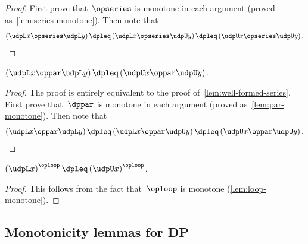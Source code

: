 \begin{proof}
First prove that~$\opseries$ is monotone in each argument (proved
as~\cref{lem:series-monotone}). Then note that
\[
\left(\udpL x\opseries\udpL y\right)\dpleq\left(\udpL x\opseries\udpU y\right)\dpleq\left(\udpU x\opseries\udpU y\right).
\]
\end{proof}
\begin{lemma}
\label{lem:well-formed-par}$\left(\udpL x\oppar\udpL y\right)\dpleq\left(\udpU x\oppar\udpU y\right)$.
\end{lemma}
\begin{proof}
The proof is entirely equivalent to the proof of~\cref{lem:well-formed-series}.
First prove that~$\dppar$ is monotone in each argument (proved as~\cref{lem:par-monotone}).
Then note that~
\[
\left(\udpL x\oppar\udpL y\right)\dpleq\left(\udpL x\oppar\udpU y\right)\dpleq\left(\udpU x\oppar\udpU y\right).
\]
\end{proof}

\begin{lemma}
\label{lem:well-formed-loop}$\left(\udpL x\right)^{\oploop}\dpleq\left(\udpU x\right)^{\oploop}$.
\end{lemma}
\begin{proof}
This follows from the fact that~$\oploop$ is monotone (\cref{lem:loop-monotone}).
\end{proof}


\subsection{Monotonicity lemmas for DP}

